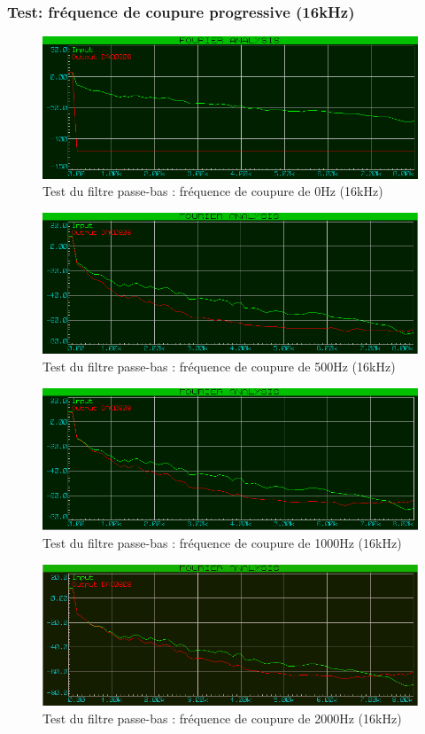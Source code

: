 \documentclass{article}
\begin{document}
    \subsubsection{Test: fréquence de coupure progressive (16kHz)}
    \begin{figure}[H]
        \centering
        \includegraphics[width=.75\textwidth]{./images/spectrum_low_pass_0_16k.png}
        \caption{Test du filtre passe-bas : fréquence de coupure de 0Hz (16kHz)}
    \end{figure}
    \begin{figure}[H]
        \centering
        \includegraphics[width=.75\textwidth]{./images/spectrum_low_pass_500_16k.png}
        \caption{Test du filtre passe-bas : fréquence de coupure de 500Hz (16kHz)}
    \end{figure}
    \begin{figure}[H]
        \centering
        \includegraphics[width=.75\textwidth]{./images/spectrum_low_pass_1000_16k.png}
        \caption{Test du filtre passe-bas : fréquence de coupure de 1000Hz (16kHz)}
    \end{figure}
    \begin{figure}[H]
        \centering
        \includegraphics[width=.75\textwidth]{./images/spectrum_low_pass_2000_16k.png}
        \caption{Test du filtre passe-bas : fréquence de coupure de 2000Hz (16kHz)}
    \end{figure}
\end{document}
